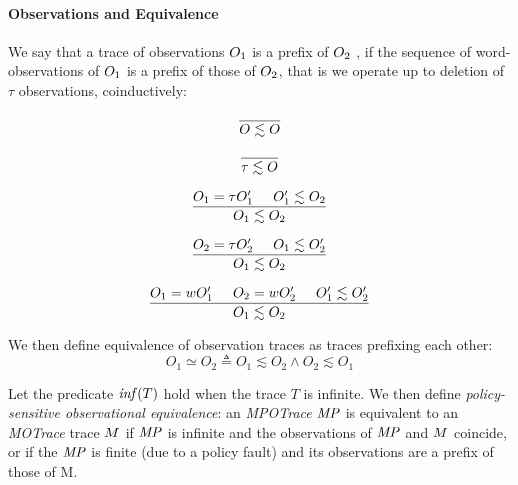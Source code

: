 \documentclass[acmsmall,review,anonymous]{acmart}\settopmatter{printfolios=true,printccs=false,printacmref=false}
\begin{document}
\paragraph*{Observations and Equivalence}

We say that a trace of observations $O_1$ is a prefix of $O_2$
, if the
sequence of word-observations of $O_1$ is a prefix of those of
$O_2$, that is we operate up to deletion of \(\tau\) observations, coinductively:

\[\frac{} {O \lesssim O}\]

\[\frac{} {\tau \lesssim O}\]

\[\frac{O_1 = \tau O_1' \hspace{.5cm} O_1' \lesssim O_2}
       {O_1 \lesssim O_2}\]

\[\frac{O_2 = \tau O_2' \hspace{.5cm} O_1 \lesssim O_2'}
       {O_1 \lesssim O_2}\]

\[\frac{O_1 = w O_1' \hspace{.5cm} O_2 = w O_2' \hspace{.5cm} O_1' \lesssim O_2'}
       {O_1 \lesssim O_2}\]


We then define equivalence of observation traces as traces prefixing each other:
\[O_1 \simeq O_2 \triangleq O_1 \lesssim O_2 \land O_2 \lesssim O_1\]



Let the predicate \(\mathit{inf}(T)\) hold when the trace $T$ is infinite.
We then define {\em policy-sensitive observational equivalence}: an
{\it MPOTrace} \(\mathit{MP}\) is equivalent to an {\it MOTrace} trace \(M\) if \(\mathit{MP}\)
is infinite and the observations of \(\mathit{MP}\) and \(M\) coincide, or if the \(\mathit{MP}\)
is finite (due to a policy fault) and its observations are a prefix of those of M.
\end{document}
